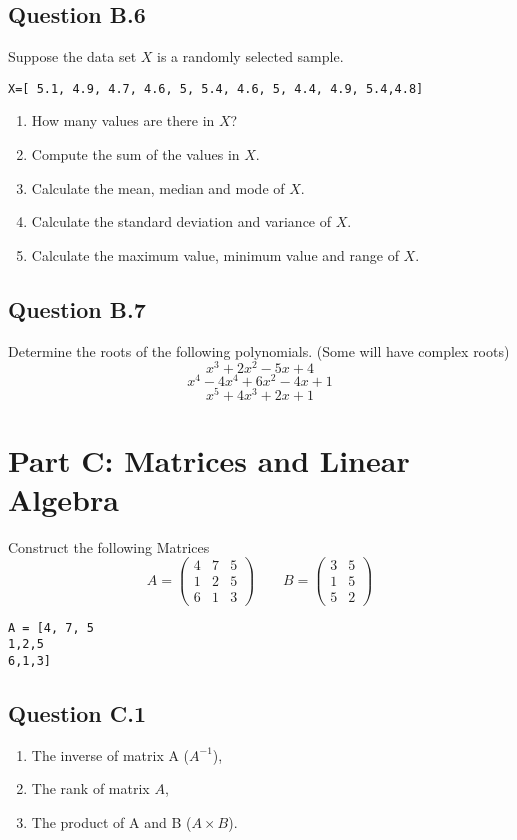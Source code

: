 \documentclass[12pt]{article}
\begin{document}
\subsection*{Question B.6}
Suppose the data set $X$ is a randomly selected sample.
\begin{framed}
\begin{verbatim}
X=[ 5.1, 4.9, 4.7, 4.6, 5, 5.4, 4.6, 5, 4.4, 4.9, 5.4,4.8]
 \end{verbatim}
\end{framed}
\begin{enumerate}
\item How many values are there in $X$?
\item Compute the sum of the values in $X$.
\item Calculate the mean, median and mode of $X$.
\item Calculate the standard deviation and variance of $X$.
\item Calculate the maximum value, minimum value and range of $X$.
\end{enumerate}

\subsection*{Question B.7}
Determine the roots of the following polynomials. (Some will have complex roots)
\[ x^3 + 2x^2 - 5x + 4 \]
\[ x^4 - 4x^4 + 6x^2 - 4x + 1 \]
\[ x^5 + 4x^3 + 2x + 1  \]
\newpage
\section*{Part C: Matrices and Linear Algebra}

Construct the following Matrices
{
\LARGE
\[ A =  \left( \begin{array}{ccc}
4 & 7 & 5 \\ 
1 & 2 & 5 \\ 
6 & 1 & 3
\end{array}   \right)
\qquad B = \left( \begin{array}{cc}
3 & 5 \\ 
1 & 5 \\ 
5 & 2
\end{array} \right)   \]
}
\begin{framed}
\begin{verbatim}
A = [4, 7, 5
1,2,5
6,1,3]
\end{verbatim}
\end{framed}
\subsection*{Question C.1}
\begin{enumerate}
\item The inverse of matrix A ($A^{-1}$),
\item The rank of matrix $A$,
\item The product of A and B ($A \times B$).
\end{enumerate}
\end{document}
